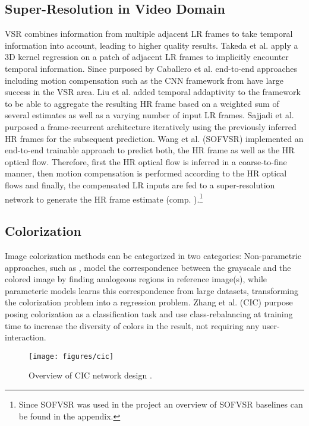 \subsection{Super-Resolution in Video Domain}
\ac{VSR} combines information from multiple adjacent LR frames
to take temporal information into account, leading to higher quality results.
Takeda et al. \cite{SRWESME} apply a 3D kernel regression on a patch of adjacent
\ac{LR} frames to implicitly encounter temporal information. Since purposed by
Caballero et al. \cite{RTVSRWSTNAMC} end-to-end approaches including motion
compensation such as the CNN framework from \cite{RTVSRWSTNAMC} have large success
in the VSR area. Liu et al. \cite{RVSRWLTD} added temporal addaptivity to the
framework to be able to aggregate the resulting \ac{HR} frame based on a weighted
sum of several estimates as well as a varying number of input LR frames. Sajjadi
et al. \cite{FRVSR} purposed a frame-recurrent architecture iteratively using
the previously inferred \ac{HR} frames for the subsequent prediction. Wang et al.
\cite{LFVSRTHROFE} (SOFVSR) implemented an end-to-end trainable approach to predict
both, the \ac{HR} frame as well as the HR optical flow. Therefore, first the HR
optical flow is inferred in a coarse-to-fine manner, then motion compensation is
performed according to the HR optical flows and finally, the compensated LR
inputs are fed to a super-resolution network to generate the HR frame estimate
(comp. ).\footnote{Since SOFVSR was used in the project
an overview of SOFVSR baselines can be found in the appendix.}

\subsection{Colorization}
Image colorization methods can be categorized in two categories: Non-parametric
approaches, such as \cite{ICUSI}, model the correspondence between the grayscale
and the colored image by finding analogeous regions in reference image(s),
while parameteric models learns this correspondence from large datasets,
transforming the colorization problem into a regression problem. Zhang et al.
\cite{CIC} (CIC) purpose posing colorization as a classification task and use
class-rebalancing at training time to increase the diversity of colors in the
result, not requiring any user-interaction.

\begin{figure}[!htbp]
	\centering
	\texttt{[image: figures/cic]}
	\caption{Overview of CIC network design \cite{CIC}.}
  \label{fig:cic}
\end{figure}

